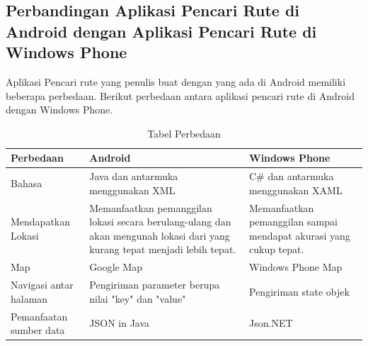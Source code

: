 \subsection{Perbandingan Aplikasi Pencari Rute di Android dengan Aplikasi Pencari Rute di Windows Phone}
\label{lab:Perbandingan}
\hspace{0.5cm} Aplikasi Pencari rute yang penulis buat dengan yang ada di Android memiliki beberapa perbedaan. Berikut perbedaan antara aplikasi pencari rute di Android dengan Windows Phone.

\begin{table}[h]
	\centering
		\begin{tabular}{|p{4cm}|p{4cm}|p{4cm}|}\hline
				Perbedaan & Android & Windows Phone \\ \hline
				Bahasa & Java dan antarmuka menggunakan XML & C\# dan antarmuka menggunakan XAML \\ \hline
				Mendapatkan Lokasi & Memanfaatkan pemanggilan lokasi secara berulang-ulang dan akan mengunah lokasi dari yang kurang tepat menjadi lebih tepat. & Memanfaatkan pemanggilan sampai mendapat akurasi yang cukup tepat. \\ \hline
				Map  & Google Map & Windows Phone Map \\ \hline
				Navigasi antar halaman  & Pengiriman parameter berupa nilai "key" dan "value" & Pengiriman state objek \\ \hline
				Pemanfaatan sumber data & JSON in Java & Json.NET \\ \hline
		\end{tabular}
	\caption{Tabel Perbedaan}
	\label{tab:TabelPerbedaan}
\end{table}